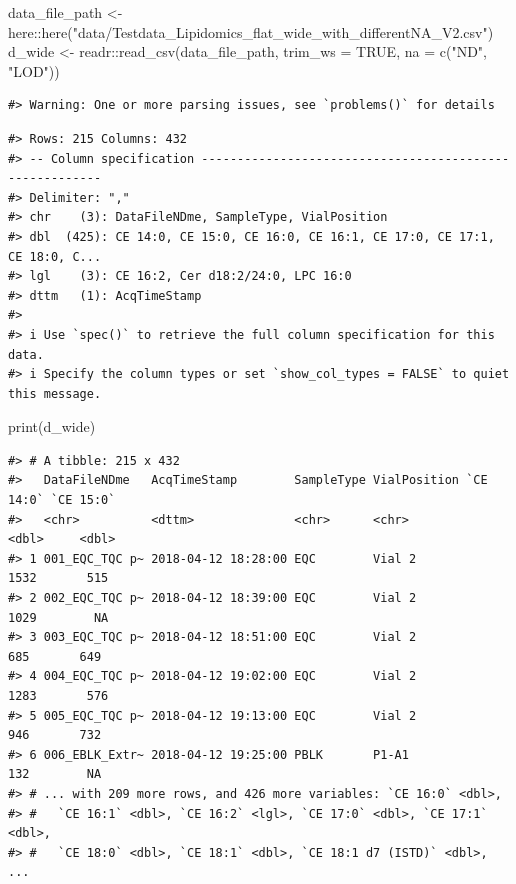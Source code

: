 \documentclass[
  letterpaper,
  DIV=11,
  numbers=noendperiod]{scrreprt}
\newenvironment{Shaded}{\begin{snugshade}}{\end{snugshade}}
\newcommand{\AttributeTok}[1]{\textcolor[rgb]{0.40,0.45,0.13}{#1}}
\newcommand{\ConstantTok}[1]{\textcolor[rgb]{0.56,0.35,0.01}{#1}}
\newcommand{\FunctionTok}[1]{\textcolor[rgb]{0.28,0.35,0.67}{#1}}
\newcommand{\NormalTok}[1]{\textcolor[rgb]{0.00,0.23,0.31}{#1}}
\newcommand{\OtherTok}[1]{\textcolor[rgb]{0.00,0.23,0.31}{#1}}
\newcommand{\SpecialCharTok}[1]{\textcolor[rgb]{0.37,0.37,0.37}{#1}}
\newcommand{\StringTok}[1]{\textcolor[rgb]{0.13,0.47,0.30}{#1}}
\begin{document}
\begin{Shaded}
\begin{Highlighting}[]
\NormalTok{data\_file\_path }\OtherTok{\textless{}{-}}\NormalTok{ here}\SpecialCharTok{::}\FunctionTok{here}\NormalTok{(}\StringTok{"data/Testdata\_Lipidomics\_flat\_wide\_with\_differentNA\_V2.csv"}\NormalTok{)}
\NormalTok{d\_wide }\OtherTok{\textless{}{-}}\NormalTok{ readr}\SpecialCharTok{::}\FunctionTok{read\_csv}\NormalTok{(data\_file\_path, }
                          \AttributeTok{trim\_ws =} \ConstantTok{TRUE}\NormalTok{, }
                          \AttributeTok{na =} \FunctionTok{c}\NormalTok{(}\StringTok{"ND"}\NormalTok{, }\StringTok{"LOD"}\NormalTok{))}
\end{Highlighting}
\end{Shaded}

\begin{verbatim}
#> Warning: One or more parsing issues, see `problems()` for details
\end{verbatim}

\begin{verbatim}
#> Rows: 215 Columns: 432
#> -- Column specification --------------------------------------------------------
#> Delimiter: ","
#> chr    (3): DataFileNDme, SampleType, VialPosition
#> dbl  (425): CE 14:0, CE 15:0, CE 16:0, CE 16:1, CE 17:0, CE 17:1, CE 18:0, C...
#> lgl    (3): CE 16:2, Cer d18:2/24:0, LPC 16:0
#> dttm   (1): AcqTimeStamp
#> 
#> i Use `spec()` to retrieve the full column specification for this data.
#> i Specify the column types or set `show_col_types = FALSE` to quiet this message.
\end{verbatim}

\begin{Shaded}
\begin{Highlighting}[]
\FunctionTok{print}\NormalTok{(d\_wide)}
\end{Highlighting}
\end{Shaded}

\begin{verbatim}
#> # A tibble: 215 x 432
#>   DataFileNDme   AcqTimeStamp        SampleType VialPosition `CE 14:0` `CE 15:0`
#>   <chr>          <dttm>              <chr>      <chr>            <dbl>     <dbl>
#> 1 001_EQC_TQC p~ 2018-04-12 18:28:00 EQC        Vial 2            1532       515
#> 2 002_EQC_TQC p~ 2018-04-12 18:39:00 EQC        Vial 2            1029        NA
#> 3 003_EQC_TQC p~ 2018-04-12 18:51:00 EQC        Vial 2             685       649
#> 4 004_EQC_TQC p~ 2018-04-12 19:02:00 EQC        Vial 2            1283       576
#> 5 005_EQC_TQC p~ 2018-04-12 19:13:00 EQC        Vial 2             946       732
#> 6 006_EBLK_Extr~ 2018-04-12 19:25:00 PBLK       P1-A1              132        NA
#> # ... with 209 more rows, and 426 more variables: `CE 16:0` <dbl>,
#> #   `CE 16:1` <dbl>, `CE 16:2` <lgl>, `CE 17:0` <dbl>, `CE 17:1` <dbl>,
#> #   `CE 18:0` <dbl>, `CE 18:1` <dbl>, `CE 18:1 d7 (ISTD)` <dbl>, ...
\end{verbatim}
\end{document}
